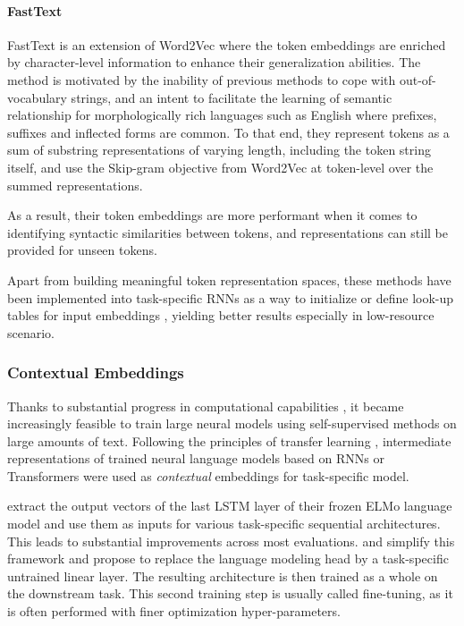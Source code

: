 \paragraph*{FastText}

FastText \citep{bojanowski-etal-2017-enriching} is an extension of Word2Vec where the token embeddings are enriched by character-level information to enhance their generalization abilities. The method is motivated by the inability of previous methods to cope with out-of-vocabulary strings, and an intent to facilitate the learning of semantic relationship for morphologically rich languages such as English where prefixes, suffixes and inflected forms are common. To that end, they represent tokens as a sum of substring representations of varying length, including the token string itself, and use the Skip-gram objective from Word2Vec at token-level over the summed representations. 

As a result, their token embeddings are more performant when it comes to identifying syntactic similarities between tokens, and representations can still be provided for unseen tokens.

Apart from building meaningful token representation spaces, these methods have been implemented into task-specific RNNs as a way to initialize or define look-up tables for input embeddings \citep{lstm_w2v, MUHAMMAD2021728}, yielding better results especially in low-resource scenario.

\subsubsection{Contextual Embeddings}

Thanks to substantial progress in computational capabilities \citep{owens_gpu}, it became increasingly feasible to train large neural models using self-supervised methods on large amounts of text. Following the principles of transfer learning \citep{tl_survey}, intermediate representations of trained neural language models based on RNNs or Transformers were used as \textit{contextual} embeddings for task-specific model. 

\citet{peters-etal-2018-deep} extract the output vectors of the last LSTM layer of their frozen ELMo language model and use them as inputs for various task-specific sequential architectures. This leads to substantial improvements across most evaluations. \citet{devlin-etal-2019-bert} and \citet{Radford2018ImprovingLU} simplify this framework and propose to replace the language modeling head by a task-specific untrained linear layer. The resulting architecture is then trained as a whole on the downstream task. This second training step is usually called fine-tuning, as it is often performed with finer optimization hyper-parameters.

